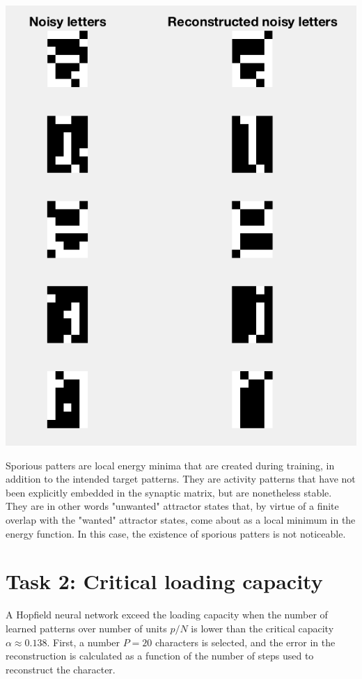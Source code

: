 \documentclass[10pt]{article}
\begin{document}
\begin{multicols}{2}
\begin{itemize}
\begin{center}
      \includegraphics[height=\linewidth]{img/recons2}
    \end{center}
  \end{itemize}

  Sporious patters are local energy minima that are created during
  training, in addition to the intended target patterns. They are
  activity patterns that have not been explicitly embedded in the
  synaptic matrix, but are nonetheless stable. They are in other
  words "unwanted" attractor states that, by virtue of a finite
  overlap with the "wanted" attractor states, come about as a
  local minimum in the energy function. In this case, the existence
  of sporious patters is not noticeable.

  \section*{Task 2: Critical loading capacity}
  A Hopfield neural network exceed the loading capacity when the number of
  learned patterns over number of units $p/N$ is lower than the critical
  capacity $\alpha \approx 0.138$.
  First, a number $P = 20$ characters is selected, and the error in the
  reconstruction is calculated as a function of the number of steps used
  to reconstruct the character.


\end{multicols}
\end{document}
